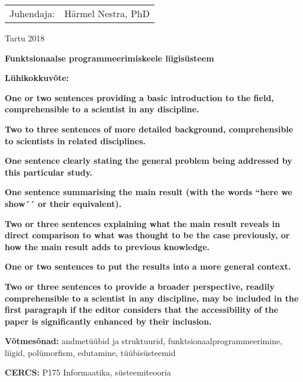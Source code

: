 \documentclass[12pt]{article}
\newcommand\markus[1]{\textcolor{roheline}{\textbf{#1}}}
\begin{document}
  \begin{flushright}
    \begin{tabular}{rl} 
      Juhendaja: & Härmel Nestra, PhD
    \end{tabular}
  \end{flushright}
  \vfill
  \centerline{Tartu 2018}
  \newpage
{
\noindent\textbf{\large Funktsionaalse programmeerimiskeele liigisüsteem}

\vspace*{1ex}

\noindent\textbf{Lühikokkuvõte:} 

\markus{One or two sentences providing a basic introduction to the field, comprehensible to a scientist in
any discipline.}

\markus{Two to three sentences of
more detailed background, comprehensible to scientists in related disciplines.}

\markus{One sentence clearly stating the general problem being addressed by this particular
study.}

\markus{One sentence summarising the main result (with the words ``here we show´´ or their equivalent).}

\markus{Two or three sentences explaining what
the main result reveals in direct
comparison to what was thought to be the case previously, or how the main result adds to previous knowledge.}

\markus{One or two sentences to put the results into a more general context.}

\markus{Two or three sentences to provide a broader perspective, readily comprehensible to a scientist in any discipline, may be included in the first paragraph if the editor considers that the accessibility of the paper is significantly enhanced by their inclusion.}

\vspace*{1ex}

\noindent
\textbf{Võtmesõnad:} andmetüübid ja struktuurid, funktsionaalprogrammeerimine, liigid, polümorfism, edutamine, tüübisüsteemid

\vspace*{1ex}

\noindent\textbf{CERCS:} P175 Informaatika, süsteemiteooria

\vspace*{1ex}}
\end{document}
